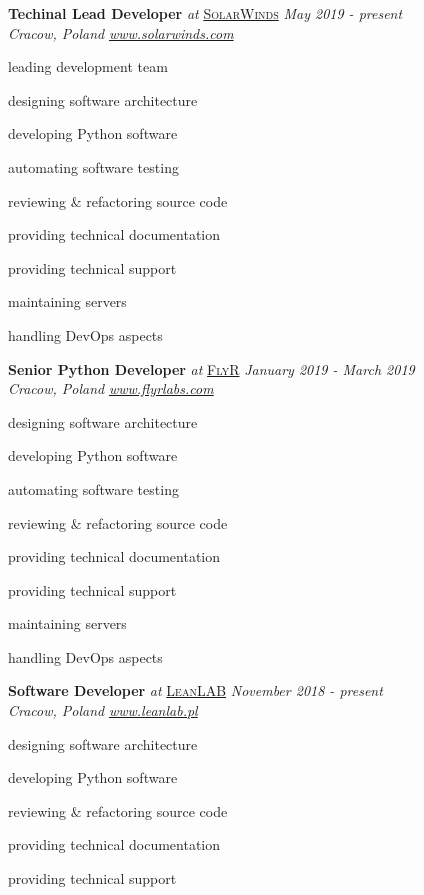 \documentclass[10pt]{article}
\newenvironment{innerlist}[1][\enskip\textbullet]%
        {\begin{compactitem}[#1]}{\end{compactitem}}
\begin{document}
\textbf{Techinal Lead Developer} \textit{at} \href{https://www.solarwinds.com}{\textsc{SolarWinds}} \hfill \textit{May 2019 - present} \\
\textit{Cracow, Poland} 
\hfill \href{https://www.solarwinds.com}{\textit{www.solarwinds.com}}
\vspace{0.1in}
\begin{innerlist}
\item leading development team
\item designing software architecture
\item developing Python software
\item automating software testing
\item reviewing & refactoring source code
\item providing technical documentation
\item providing technical support
\item maintaining servers
\item handling DevOps aspects
\end{innerlist}

\vspace{0.30in}

\textbf{Senior Python Developer} \textit{at} \href{https://www.flyrlabs.com}{\textsc{FlyR}} \hfill \textit{January 2019 - March 2019} \\
\textit{Cracow, Poland}
\hfill \href{https://www.flyrlabs.com}{\textit{www.flyrlabs.com}}
\vspace{0.1in}
\begin{innerlist}
\item designing software architecture
\item developing Python software
\item automating software testing
\item reviewing & refactoring source code
\item providing technical documentation
\item providing technical support
\item maintaining servers
\item handling DevOps aspects
\end{innerlist}

\vspace{0.30in}

\textbf{Software Developer} \textit{at} \href{https://www.leanlab.pl/}{\textsc{LeanLAB}} \hfill \textit{November 2018 - present} \\
\textit{Cracow, Poland} 
\hfill \href{https://www.leanlab.pl/}{\textit{www.leanlab.pl}} 
\vspace{0.1in}
\begin{innerlist}
\item designing software architecture
\item developing Python software
\item reviewing \& refactoring source code
\item providing technical documentation 
\item providing technical support
\end{innerlist}
\end{document}
